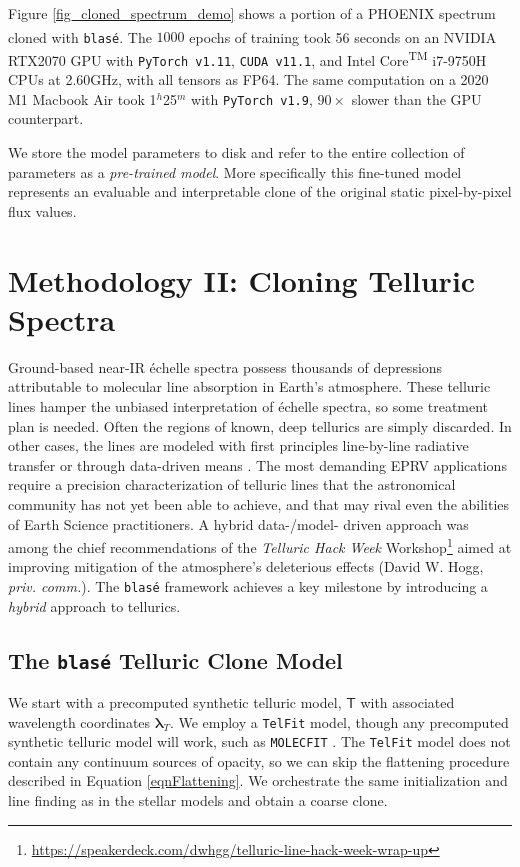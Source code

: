 \documentclass[twocolumn]{aastex631}
\begin{document}
Figure \ref{fig_cloned_spectrum_demo} shows a portion of a PHOENIX spectrum cloned with \texttt{blas\'e}. The $1000$ epochs of training took 56 seconds on an NVIDIA\textsuperscript{\tiny\textregistered} RTX2070 GPU with \texttt{PyTorch v1.11}, \texttt{CUDA v11.1}, and Intel\textsuperscript{\tiny\textregistered} Core\textsuperscript{\tiny TM} i7-9750H CPUs at 2.60GHz, with all tensors as FP64. The same computation on a 2020 M1 Macbook Air took 1$^h$25$^m$ with \texttt{PyTorch v1.9}, $90\times$ slower than the GPU counterpart.

We store the model parameters to disk and refer to the entire collection of parameters as a \emph{pre-trained model}.  More specifically this fine-tuned model represents an evaluable and interpretable clone of the original static pixel-by-pixel flux values.

\section{Methodology II: Cloning Telluric Spectra} \label{sectionTelluric}
Ground-based near-IR \'echelle spectra possess thousands of depressions attributable to molecular line absorption in Earth's atmosphere.  These telluric lines hamper the unbiased interpretation of \'echelle spectra, so some treatment plan is needed.  Often the regions of known, deep tellurics are simply discarded.  In other cases, the lines are modeled with first principles line-by-line radiative transfer \citep[\emph{e.g.} \texttt{TelFit,}][]{2014AJ....148...53G, 2005JQSRT..91..233C} or through data-driven means \citep[\emph{e.g.} \texttt{wobble,}][]{2019AJ....158..164B}.  The most demanding EPRV applications require a precision characterization of telluric lines that the astronomical community has not yet been able to achieve, and that may rival even the abilities of Earth Science practitioners.  A hybrid data-/model- driven approach was among the chief recommendations of the \emph{Telluric Hack Week} Workshop\footnote{\url{https://speakerdeck.com/dwhgg/telluric-line-hack-week-wrap-up}} aimed at improving mitigation of the atmosphere's deleterious effects (David W. Hogg, \emph{priv. comm.}).  The \texttt{blas\'e} framework achieves a key milestone by introducing a \emph{hybrid} approach to tellurics.

\subsection{The \texttt{blas\'e} Telluric Clone Model}
We start with a precomputed synthetic telluric model, $\mathsf{T}$ with associated wavelength coordinates $\bm{\lambda}_T$.  We employ a \texttt{TelFit} model, though any precomputed synthetic telluric model will work, such as \texttt{MOLECFIT} \citep{2015A&A...576A..77}.  The \texttt{TelFit} model does not contain any continuum sources of opacity, so we can skip the flattening procedure described in Equation \ref{eqnFlattening}.  We orchestrate the same initialization and line finding as in the stellar models and obtain a coarse clone.
\end{document}
